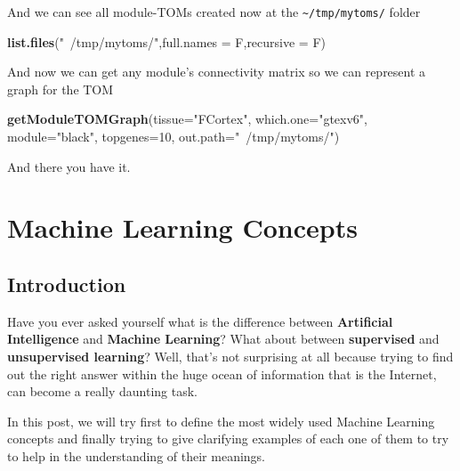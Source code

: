 \documentclass[]{book}
\newenvironment{Shaded}{\begin{snugshade}}{\end{snugshade}}
\newcommand{\KeywordTok}[1]{\textcolor[rgb]{0.13,0.29,0.53}{\textbf{#1}}}
\newcommand{\DataTypeTok}[1]{\textcolor[rgb]{0.13,0.29,0.53}{#1}}
\newcommand{\DecValTok}[1]{\textcolor[rgb]{0.00,0.00,0.81}{#1}}
\newcommand{\StringTok}[1]{\textcolor[rgb]{0.31,0.60,0.02}{#1}}
\newcommand{\NormalTok}[1]{#1}
\begin{document}
And we can see all module-TOMs created now at the
\texttt{\textasciitilde{}/tmp/mytoms/} folder

\begin{Shaded}
\begin{Highlighting}[]
\KeywordTok{list.files}\NormalTok{(}\StringTok{"~/tmp/mytoms/"}\NormalTok{,}\DataTypeTok{full.names =}\NormalTok{ F,}\DataTypeTok{recursive =}\NormalTok{ F)}
\end{Highlighting}
\end{Shaded}

And now we can get any module's connectivity matrix so we can represent
a graph for the TOM

\begin{Shaded}
\begin{Highlighting}[]
\KeywordTok{getModuleTOMGraph}\NormalTok{(}\DataTypeTok{tissue=}\StringTok{"FCortex"}\NormalTok{,}
                  \DataTypeTok{which.one=}\StringTok{"gtexv6"}\NormalTok{,}
                  \DataTypeTok{module=}\StringTok{"black"}\NormalTok{,}
                  \DataTypeTok{topgenes=}\DecValTok{10}\NormalTok{,}
                  \DataTypeTok{out.path=}\StringTok{"~/tmp/mytoms/"}\NormalTok{)}
\end{Highlighting}
\end{Shaded}

And there you have it.

\chapter{Machine Learning Concepts}\label{machine-learning-concepts}

\section{Introduction}\label{introduction-1}

Have you ever asked yourself what is the difference between
\textbf{Artificial Intelligence} and \textbf{Machine Learning}? What
about between \textbf{supervised} and \textbf{unsupervised learning}?
Well, that's not surprising at all because trying to find out the right
answer within the huge ocean of information that is the Internet, can
become a really daunting task.

In this post, we will try first to define the most widely used Machine
Learning concepts and finally trying to give clarifying examples of each
one of them to try to help in the understanding of their meanings.
\end{document}
